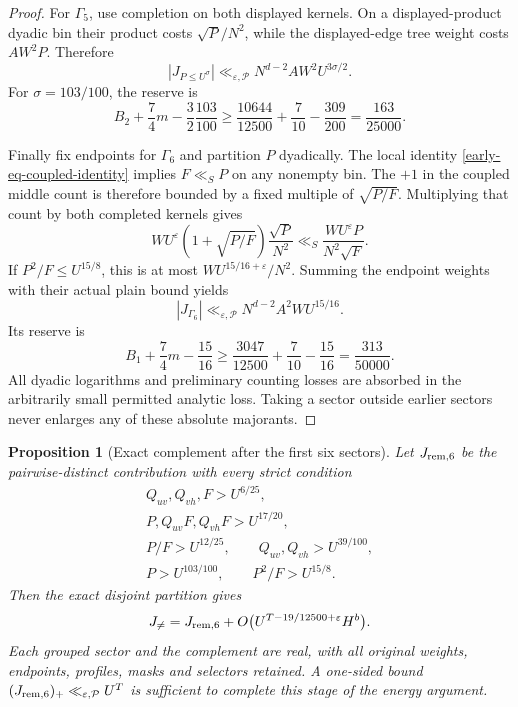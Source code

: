 \documentclass[11pt]{article}
\newtheorem{proposition}[theorem]{Proposition}
\theoremstyle{definition}
\newcommand{\eps}{\varepsilon}
\newcommand{\lls}{\ll_{\eps,\mathcal P}}
\begin{document}
\begin{proof}
For \(\Gamma_5\), use completion on both displayed kernels.
On a displayed-product dyadic bin their product costs
\(\sqrt P/N^2\), while the displayed-edge tree weight costs
\(AW^2P\).  Therefore
\[
 |J_{P\le U^\sigma}|
       \lls N^{d-2}AW^2U^{3\sigma/2}.
\]
For \(\sigma=103/100\), the reserve is
\[
 B_2+\frac74m-\frac32\frac{103}{100}
 \ge\frac{10644}{12500}+\frac7{10}-\frac{309}{200}
 =\frac{163}{25000}.
\]

Finally fix endpoints for \(\Gamma_6\) and partition \(P\)
dyadically.  The local identity
\eqref{early-eq-coupled-identity} implies \(F\ll_SP\) on any
nonempty bin.  The \(+1\) in the coupled middle count is therefore
bounded by a fixed multiple of \(\sqrt{P/F}\).
Multiplying that count by both completed kernels gives
\[
 WU^\eps(1+\sqrt{P/F})\frac{\sqrt P}{N^2}
       \ll_S \frac{WU^\eps P}{N^2\sqrt F}.
\]
If \(P^2/F\le U^{15/8}\), this is at most
\(WU^{15/16+\eps}/N^2\).  Summing the endpoint weights with their
actual plain bound yields
\[
 |J_{\Gamma_6}|\lls N^{d-2}A^2WU^{15/16}.
\]
Its reserve is
\[
 B_1+\frac74m-\frac{15}{16}
 \ge\frac{3047}{12500}+\frac7{10}-\frac{15}{16}
 =\frac{313}{50000}.
\]
All dyadic logarithms and preliminary counting losses are absorbed
in the arbitrarily small permitted analytic loss.  Taking a sector
outside earlier sectors never enlarges any of these absolute
majorants.
\end{proof}

\begin{proposition}[Exact complement after the first six sectors]
\label{early-prop-six-complement}
Let \(J_{\rm rem,6}\) be the pairwise-distinct contribution with every
strict condition
\begin{equation}\label{early-eq-six-complement}
 \begin{gathered}
 Q_{uv},Q_{vh},F>U^{6/25},\\
 P,Q_{uv}F,Q_{vh}F>U^{17/20},\\
 P/F>U^{12/25},\qquad
 Q_{uv},Q_{vh}>U^{39/100},\\
 P>U^{103/100},\qquad P^2/F>U^{15/8}.
 \end{gathered}
\end{equation}
Then the exact disjoint partition gives
\[
 J_{\ne}=J_{\rm rem,6}
       +O\bigl(U^{T-19/12500+\eps}H^b\bigr).
\]
Each grouped sector and the complement are real, with all original
weights, endpoints, profiles, masks and selectors retained.
A one-sided bound \((J_{\rm rem,6})_+\lls U^T\) is sufficient to
complete this stage of the energy argument.
\end{proposition}
\end{document}
